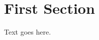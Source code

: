 \documentclass[../new]{subfiles}
\begin{document}


\section{First Section}
Text goes here.

\end{document}
